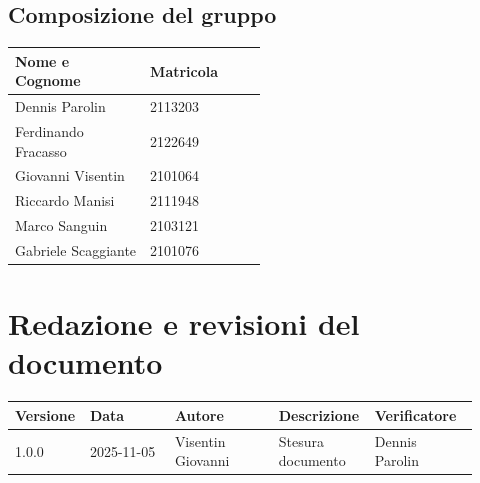 \documentclass[a4paper,12pt]{article}
\begin{document}
\subsection{Composizione del gruppo}

\begin{center}
\small
\renewcommand{\arraystretch}{1.2}
\begin{tabular}{|p{0.3\linewidth}|p{0.2\linewidth}|}
\hline
\rowcolor{gray!60}
\textbf{Nome e Cognome} & \textbf{Matricola} \\
\hline
Dennis Parolin & 2113203 \\
\hline
Ferdinando Fracasso & 2122649 \\
\hline
Giovanni Visentin & 2101064 \\
\hline
Riccardo Manisi & 2111948 \\
\hline
Marco Sanguin & 2103121 \\
\hline
Gabriele Scaggiante & 2101076 \\
\hline
\end{tabular}
\end{center}

\clearpage
\section{Redazione e revisioni del documento}

\begin{center}
\small
\renewcommand{\arraystretch}{1.2} 
\begin{tabular}{|p{0.1\linewidth}|p{0.18\linewidth}|p{0.22\linewidth}|p{0.20\linewidth}|p{0.22\linewidth}|}
\hline
\rowcolor{gray!60} 
\textbf{Versione} & \textbf{Data} & \textbf{Autore} & \textbf{Descrizione} & \textbf{Verificatore} \\
\hline
\rowcolor{white}
1.0.0 & 2025-11-05 & Visentin Giovanni & Stesura documento & Dennis Parolin \\
\hline
\end{tabular}
\end{center}
\end{document}
